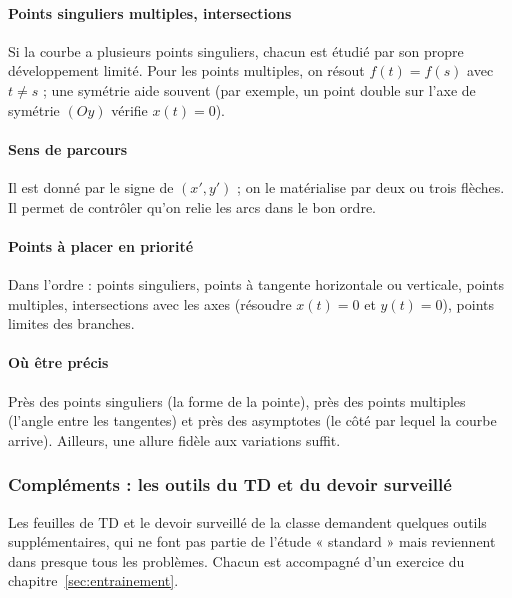 \documentclass[a4paper,11pt]{article}
\numberwithin{equation}{section}
\numberwithin{figure}{section}
\numberwithin{table}{section}
\theoremstyle{enonce}
\theoremstyle{exemple}
\theoremstyle{remarque}
\begin{document}
\paragraph{Points singuliers multiples, intersections} Si la courbe a plusieurs points singuliers, chacun est étudié par son
propre développement limité. Pour les points multiples, on résout $f(t)=f(s)$ avec $t\neq s$ ; une symétrie aide souvent
(par exemple, un point double sur l'axe de symétrie $(Oy)$ vérifie $x(t)=0$).

\paragraph{Sens de parcours} Il est donné par le signe de $(x',y')$ ; on le matérialise par deux ou trois flèches. Il permet de
contrôler qu'on relie les arcs dans le bon ordre.

\paragraph{Points à placer en priorité} Dans l'ordre : points singuliers, points à tangente horizontale ou verticale, points
multiples, intersections avec les axes (résoudre $x(t)=0$ et $y(t)=0$), points limites des branches.

\paragraph{Où être précis} Près des points singuliers (la forme de la pointe), près des points multiples (l'angle entre les
tangentes) et près des asymptotes (le côté par lequel la courbe arrive). Ailleurs, une allure fidèle aux variations suffit.


\subsubsection{Compléments : les outils du TD et du devoir surveillé}\label{sec:outils-td}

Les feuilles de TD et le devoir surveillé de la classe demandent quelques outils supplémentaires, qui ne font pas partie
de l'étude « standard » mais reviennent dans presque tous les problèmes. Chacun est accompagné d'un exercice du
chapitre~\ref{sec:entrainement}.
\end{document}

